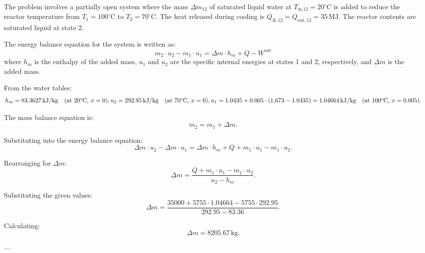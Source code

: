 The problem involves a partially open system where the mass \( \Delta m_{12} \) of saturated liquid water at \( T_{\text{in,12}} = 20^\circ\text{C} \) is added to reduce the reactor temperature from \( T_1 = 100^\circ\text{C} \) to \( T_2 = 70^\circ\text{C} \). The heat released during cooling is \( Q_{R,12} = Q_{\text{out},12} = 35 \, \text{MJ} \). The reactor contents are saturated liquid at state 2.  

The energy balance equation for the system is written as:  
\[
m_2 \cdot u_2 - m_1 \cdot u_1 = \Delta m \cdot h_m + Q - W^{\text{out}}
\]  
where \( h_m \) is the enthalpy of the added mass, \( u_1 \) and \( u_2 \) are the specific internal energies at states 1 and 2, respectively, and \( \Delta m \) is the added mass.  

From the water tables:  
\[
h_m = 83.3627 \, \text{kJ/kg} \quad \text{(at 20°C, \( x = 0 \))},  
u_2 = 292.95 \, \text{kJ/kg} \quad \text{(at 70°C, \( x = 0 \))},  
u_1 = 1.0435 + 0.005 \cdot (1.673 - 1.0435) = 1.04664 \, \text{kJ/kg} \quad \text{(at 100°C, \( x = 0.005 \))}.
\]  

The mass balance equation is:  
\[
m_2 = m_1 + \Delta m.
\]  

Substituting into the energy balance equation:  
\[
\Delta m \cdot u_2 - \Delta m \cdot u_1 = \Delta m \cdot h_m + Q + m_1 \cdot u_1 - m_1 \cdot u_2.
\]  

Rearranging for \( \Delta m \):  
\[
\Delta m = \frac{Q + m_1 \cdot u_1 - m_1 \cdot u_2}{u_2 - h_m}.
\]  

Substituting the given values:  
\[
\Delta m = \frac{35000 + 5755 \cdot 1.04664 - 5755 \cdot 292.95}{292.95 - 83.36}.
\]  

Calculating:  
\[
\Delta m = 8205.67 \, \text{kg}.
\]  

---